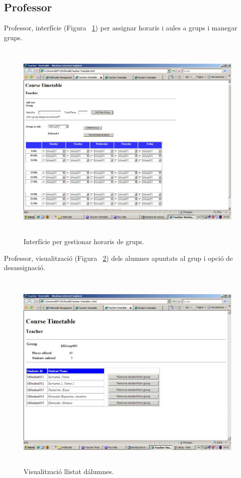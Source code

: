 \documentclass[a4paper]{report}  %
\begin{document}
\subsection{Professor}
Professor, interfície (Figura ~\ref{fig:Teacher-Timetable}) per assignar horaris i aules a grups i manegar grups. 
		\begin{figure}[H] %
		\begin{center}
		\includegraphics[width=12cm,height=10cm]{img/Teacher-Timetable.jpg}
		\caption[List caption]{Interfície per gestionar horaris de grups.}
		\label{fig:Teacher-Timetable}
		\end{center}
		\end{figure}
Professor, visualització (Figura ~\ref{fig:Teacher-Timetable-2}) dels alumnes apuntats al grup i opció de desassignació.
		\begin{figure}[H] %
		\begin{center}
		\includegraphics[width=12cm,height=10cm]{img/Teacher-Timetable-2.jpg}
		\caption[List caption]{Visualització llistat d\'alumnes.}
		\label{fig:Teacher-Timetable-2}
		\end{center}
		\end{figure}
\end{document}
